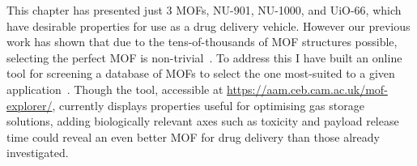 This chapter has presented just 3 MOFs, NU-901, NU-1000, and UiO-66, which have desirable properties for use as a drug delivery vehicle.
However our previous work has shown that due to the tens-of-thousands of MOF structures possible, selecting the perfect MOF is non-trivial~\cite{moghadam2018computer}.
To address this I have built an online tool for screening a database of MOFs to select the one most-suited to a given application~\cite{moghadam2018computer}.
Though the tool, accessible at \url{https://aam.ceb.cam.ac.uk/mof-explorer/}, currently displays properties useful for optimising gas storage solutions, adding biologically relevant axes such as toxicity and payload release time could reveal an even better MOF for drug delivery than those already investigated.
